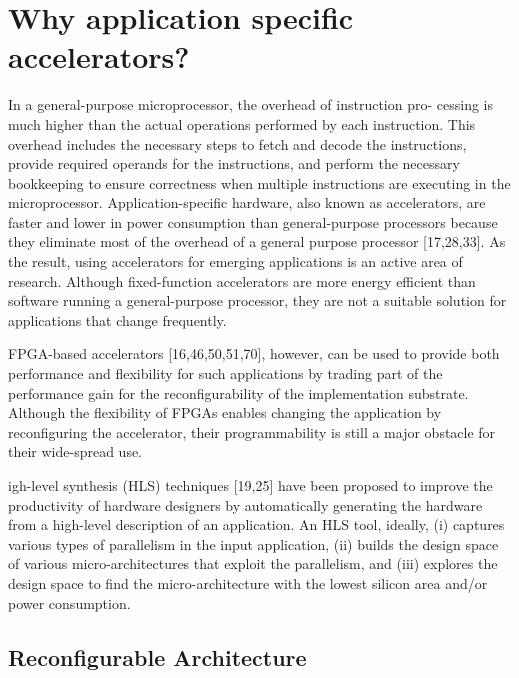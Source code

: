 
\section{Why application specific accelerators?}
\label{background:accel}

In a general-purpose microprocessor, the overhead of instruction pro- cessing is much higher than the actual operations performed by each instruction.
This overhead includes the necessary steps to fetch and decode the instructions, provide required operands for the instructions, and perform the necessary bookkeeping to ensure correctness when multiple instructions are executing in the microprocessor.
Application-specific hardware, also known as accelerators, are faster and lower in power consumption than general-purpose processors because they eliminate most of the overhead of a general purpose processor [17,28,33]. As the result, using accelerators for emerging applications is an active area of research. Although fixed-function accelerators are more energy efficient than software running a general-purpose processor, they are not a suitable solution for applications that change frequently.

FPGA-based accelerators [16,46,50,51,70], however, can be used to provide both performance and flexibility for such applications by trading part of the performance gain for the reconfigurability of the implementation substrate.
Although the flexibility of FPGAs enables changing the application by reconfiguring the accelerator, their programmability is still a major obstacle for their wide-spread use.

igh-level synthesis (HLS) techniques [19,25] have been proposed to improve the productivity of hardware designers by automatically generating the hardware from a high-level description of an application. An HLS tool, ideally, (i) captures various types of parallelism in the input application, (ii) builds the design space of various micro-architectures that exploit the parallelism, and (iii) explores the design space to find the micro-architecture with the lowest silicon area and/or power consumption.


\subsection{Reconfigurable Architecture}
\label{background:reconfigurable}

